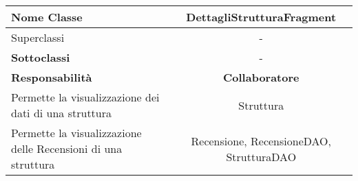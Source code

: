 
\setcounter{table}{0}
\begin{table}[H]
    \centering
    \begin{tabularx}{\textwidth}{||   X  ||  c   ||}
        \hline
        \rowcolor{Gray}
        \textbf{Nome Classe} & DettagliStrutturaFragment\\
        \hline
        Superclassi  &  - \\
        \hline
        \textbf{Sottoclassi} & - \\
        \hline
        \hline
         \textbf{Responsabilità} & \textbf{Collaboratore} \\
         \hline
          Permette la visualizzazione dei dati di una struttura & Struttura \\
         \hline
          Permette la visualizzazione delle Recensioni di una struttura & Recensione, RecensioneDAO, StrutturaDAO \\
         \hline
    \end{tabularx}
\end{table}
